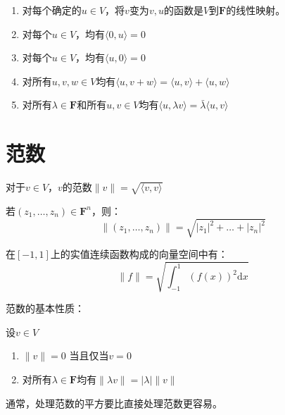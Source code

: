 \documentclass[10pt,a4paper,UTF8]{article}
\begin{document}
\begin{theorem}
\begin{enumerate}
\item 对每个确定的\(u\in V\)，将\(v\)变为\(v,u\)的函数是\(V\)到\(\mathbf{F}\)的线性映射。
\item 对每个\(u\in V\)，均有\(\langle 0,u \rangle  = 0\)
\item 对每个\(u\in V\)，均有\(\langle u,0 \rangle  = 0\)
\item 对所有\(u,v,w\in V\)均有\(\langle u,v+w \rangle = \langle u,v \rangle  + \langle u,w \rangle\)
\item 对所有\(\lambda\in \mathbf{F}\)和所有\(u,v\in V\)均有\(\langle u,\lambda v \rangle = \bar{\lambda} \langle u,v \rangle\)
\end{enumerate}
\end{theorem}
\section{范数}
\label{sec:org2b0c3d3}


\begin{definition}
对于\(v\in V\)，\(v\)的范数\(\|v\| = \sqrt{\langle v,v \rangle }\)
\end{definition}

\begin{instance}
若\((z_{1},\ldots ,z_{n}) \in \mathbf{F}^{n}\)，则：
\begin{equation}
\label{eq:7}
\| (z_{1},\ldots ,z_{n}) \| = \sqrt{ |z_{1}|^{2} +　\ldots + |z_{n}|^{2}}
\end{equation}
\end{instance}

\begin{instance}
在\([-1,1]\)上的实值连续函数构成的向量空间中有：
\begin{equation}
\label{eq:8}
\| f \| = \sqrt{\int_{-1}^{1} (f(x))^{2} \mathrm{d}x }
\end{equation}
\end{instance}
范数的基本性质：
\begin{theorem}
设\(v\in V\)
\begin{enumerate}
\item \(\| v\| = 0\) 当且仅当\(v=0\)
\item 对所有\(\lambda\in \mathbf{F}\)均有\(\| \lambda v\| = |\lambda| \|v\|\)
\end{enumerate}
\end{theorem}
通常，处理范数的平方要比直接处理范数更容易。
\end{document}
